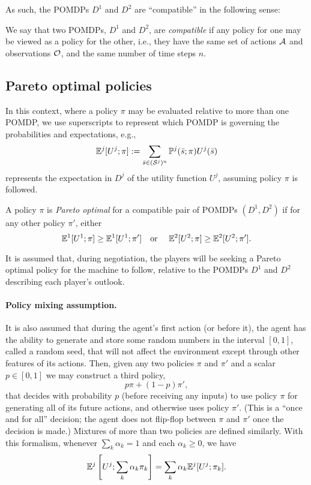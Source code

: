 \documentclass{article}
\newcommand{\seq}{\bar}
\begin{document}
As such, the POMDPs $D^1$ and $D^2$ are ``compatible'' in the following sense:

\begin{definition}  We say that two POMDPs, $D^1$ and $D^2$, are \emph{compatible} if any policy for one may be viewed as a policy for the other, i.e., they have the same set of actions $\mathcal{A}$ and observations $\mathcal{O}$, and the same number of time steps $n$.
\end{definition}

\subsection{Pareto optimal policies}

In this context, where a policy $\pi$ may be evaluated relative to more than one POMDP, we use superscripts to represent which POMDP is governing the probabilities and expectations, e.g.,
\[
\EE^j[U^j; \pi] := \sum_{\seq s \in (\Ss^j)^n} \PP^j(\bar s; \pi) U^j(\bar s)
\]
represents the expectation in $D^j$ of the utility function $U^j$, assuming policy $\pi$ is followed.
\begin{definition}  A policy $\pi$ is \emph{Pareto optimal} for a compatible pair of POMDPs $(D^1,D^2)$ if for any other policy $\pi'$, either
\[
\mathbb{E}^1[U^1;\pi] \ge \mathbb{E}^1[U^1;\pi'] \textrm{\quad or \quad} \mathbb{E}^2[U^2;\pi] \ge \mathbb{E}^2[U^2;\pi'].
\]
\end{definition}
%
It is assumed that, during negotiation, the players will be seeking a Pareto optimal policy for the machine to follow, relative to the POMDPs $D^1$ and $D^2$ describing each player's outlook.

\paragraph{Policy mixing assumption.}  It is also assumed that during the agent's first action (or before it), the agent has the ability to generate and store some random numbers in the interval $[0,1]$, called a random seed, that will not affect the environment except through other features of its actions.  Then, given any two policies $\pi$ and $\pi'$ and a scalar $p\in[0,1]$ we may construct a third policy, 
\[
p\pi + (1-p)\pi',
\]
 that decides with probability $p$ (before receiving any inputs) to use policy $\pi$ for generating all of its future actions, and otherwise uses policy $\pi'$.  (This is a ``once and for all'' decision; the agent does not flip-flop between $\pi$ and $\pi'$ once the decision is made.)  Mixtures of more than two policies are defined similarly.  With this formalism, whenever $\sum_k \alpha_k = 1$ and each $\alpha_k\ge 0$, we have
\begin{equation}\label{eqn:linearity}
\mathbb{E}^j\left[U^j ; \sum_k \alpha_k \pi_k\right] = \sum_k \alpha_k \mathbb{E}^j[U^j ; \pi_k].
\end{equation}
\end{document}
